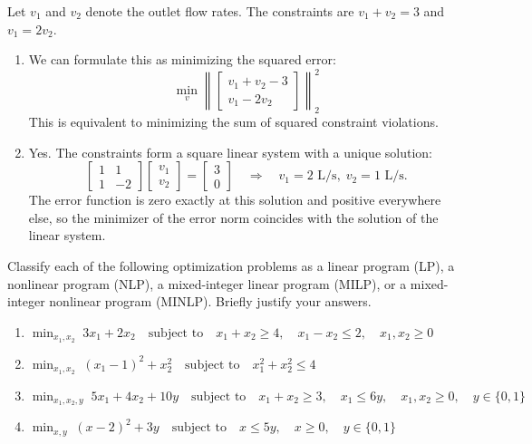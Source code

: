 \begin{solution}
    Let $v_1$ and $v_2$ denote the outlet flow rates. The constraints are $v_1 + v_2 = 3$ and $v_1 = 2v_2$.
    
    \begin{enumerate}[label=(\alph*)]
        \item We can formulate this as minimizing the squared error:
        \[
            \min_{v} \left\| \begin{bmatrix} v_1 + v_2 - 3 \\ v_1 - 2v_2 \end{bmatrix} \right\|_2^2
        \]
        This is equivalent to minimizing the sum of squared constraint violations.
        
        \item Yes. The constraints form a square linear system with a unique solution:
        \[
            \begin{bmatrix} 1 & 1 \\ 1 & -2 \end{bmatrix} \begin{bmatrix} v_1 \\ v_2 \end{bmatrix} = \begin{bmatrix} 3 \\ 0 \end{bmatrix}
            \quad\Rightarrow\quad v_1 = 2 \text{ L/s},\; v_2 = 1 \text{ L/s}.
        \]
        The error function is zero exactly at this solution and positive everywhere else, so the minimizer of the error norm coincides with the solution of the linear system.
    \end{enumerate}
\end{solution}

\begin{exercise} %
    
    Classify each of the following optimization problems as a linear program (LP), a nonlinear program (NLP), a mixed-integer linear program (MILP), or a mixed-integer nonlinear program (MINLP). Briefly justify your answers.
    \begin{enumerate}[label=(\alph*)]
        \item $\displaystyle \min_{x_1, x_2} \; 3x_1 + 2x_2 \quad \text{subject to} \quad x_1 + x_2 \ge 4, \quad x_1 - x_2 \le 2, \quad x_1, x_2 \ge 0$
        \item $\displaystyle \min_{x_1, x_2} \; (x_1 - 1)^2 + x_2^2 \quad \text{subject to} \quad x_1^2 + x_2^2 \le 4$
        \item $\displaystyle \min_{x_1, x_2, y} \; 5x_1 + 4x_2 + 10y \quad \text{subject to} \quad x_1 + x_2 \ge 3, \quad x_1 \le 6y, \quad x_1, x_2 \ge 0, \quad y \in \{0, 1\}$
        \item $\displaystyle \min_{x, y} \; (x - 2)^2 + 3y \quad \text{subject to} \quad x \le 5y, \quad x \ge 0, \quad y \in \{0, 1\}$
    \end{enumerate}
    
\end{exercise}

